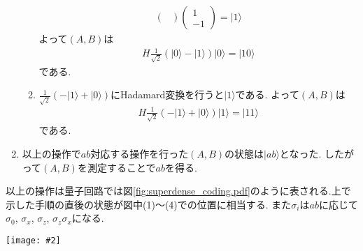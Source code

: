 \documentclass[uplatex,a4j,11pt,dvipdfmx]{jsarticle}
\makeatletter
\def\fgcaption{\def\@captype{figure}\caption}
\newcommand{\mfig}[3][width=15cm]{
\begin{center}
\texttt{[image: \#2]}
\fgcaption{#3 \label{fig:#2}}
\end{center}
}
\makeatother
\begin{document}
\begin{enumerate}
\begin{enumerate}
\begin{align}
\begin{pmatrix}
      \end{pmatrix}\begin{pmatrix}
        1\\-1
      \end{pmatrix}=|1\rangle
    \end{align}
    よって$(A,B)$は
    \begin{align}
      H\frac{1}{\sqrt{2}}(|0\rangle-|1\rangle)|0\rangle=|10\rangle
    \end{align}
    である.
    \item $\frac{1}{\sqrt{2}}(-|1\rangle+|0\rangle)$にHadamard変換を行うと$|1\rangle$である.
    よって$(A,B)$は
    \begin{align}
      H\frac{1}{\sqrt{2}}(-|1\rangle+|0\rangle)|1\rangle=|11\rangle
    \end{align}
    である.
  \end{enumerate}
  \item 以上の操作で$ab$対応する操作を行った$(A,B)$の状態は$|ab\rangle$となった.
  したがって$(A,B)$を測定することで$ab$を得る.
\end{enumerate}
以上の操作は量子回路では図\ref{fig:superdense_coding.pdf}のように表される.上で示した手順の直後の状態が図中(1)〜(4)での位置に相当する.
また$\sigma_i$は$ab$に応じて$\sigma_0$, $\sigma_x$, $\sigma_z$, $\sigma_z\sigma_x$になる.
\mfig[width=8cm]{superdense_coding.pdf}{超高密度符号化の量子回路, (1)〜(4)は上で示した各手順の後に相当する.}

\end{document}
